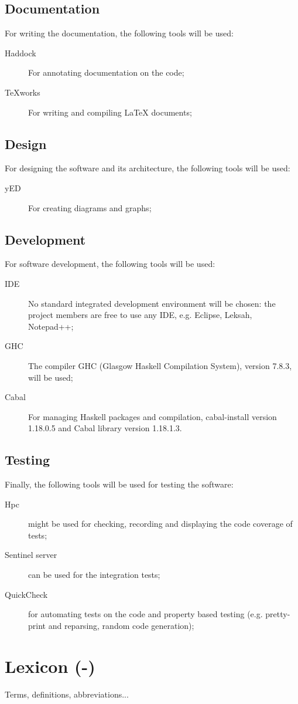 \documentclass[a4paper,12pt,abstracton,titlepage]{scrartcl}
\begin{document}
\subsection{Documentation}
For writing the documentation, the following tools will be used:
\begin{description}
	\item[Haddock] For annotating documentation on the code;
	\item[TeXworks] For writing and compiling \LaTeX{} documents;
\end{description}

\subsection{Design}
For designing the software and its architecture, the following tools will be used:
\begin{description}
	\item[yED] For creating diagrams and graphs;
\end{description}

\subsection{Development}
For software development, the following tools will be used:
\begin{description}
	\item[IDE] No standard integrated development environment will be chosen: the project members are free to use any IDE, e.g. Eclipse, Leksah, Notepad++;
	\item[GHC] The compiler GHC (Glasgow Haskell Compilation System), version 7.8.3, will be used;
	\item[Cabal] For managing Haskell packages and compilation, cabal-install version 1.18.0.5 and Cabal library version 1.18.1.3.
\end{description}

\subsection{Testing}
Finally, the following tools will be used for testing the software:
\begin{description}
	\item[Hpc] might be used for checking, recording and displaying the code coverage of tests;
	\item[Sentinel server] can be used for the integration tests;
	\item[QuickCheck] for automating tests on the code and property based testing (e.g. pretty-print and reparsing, random code generation);
\end{description}

\newpage
\appendix
\section{Lexicon (-)}
\label{sec:lexicon}
Terms, definitions, abbreviations...
\end{document}
